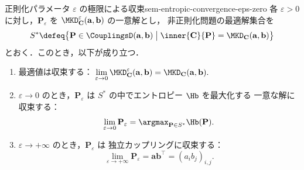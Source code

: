 \begin{theorem}{正則化パラメータ $\varepsilon$ の極限による収束}{sem-entropic-convergence-eps-zero}
  各 $\varepsilon > 0$ に対し，$\mathbf{P}_\varepsilon$ を
  $\MKD_{\mathbf{C}}^\varepsilon(\mathbf{a}, \mathbf{b})$ の一意解とし，
  非正則化問題の最適解集合を
  \[
    S^* \defeq \bigl\{ \mathbf{P} \in \CouplingsD(\mathbf{a},\mathbf{b}) \bigm|
      \inner{\mathbf{C}}{\mathbf{P}} = \MKD_{\mathbf{C}}(\mathbf{a},\mathbf{b}) \bigr\}
  \]
  とおく．このとき，以下が成り立つ．

  \begin{enumerate}
    \item[(i)]
      最適値は収束する：
      $\displaystyle
        \lim_{\varepsilon \to 0}
        \MKD_{\mathbf{C}}^\varepsilon(\mathbf{a},\mathbf{b})
        =
        \MKD_{\mathbf{C}}(\mathbf{a},\mathbf{b}).
      $
    \item[(ii)]
      $\varepsilon \to 0$ のとき，$\mathbf{P}_\varepsilon$ は
      $S^*$ の中でエントロピー $\Hb$ を最大化する
      一意な解に収束する：
      \[
        \lim_{\varepsilon \to 0} \mathbf{P}_\varepsilon
        =
        \argmax_{\mathbf{P} \in S^*} \Hb(\mathbf{P}).
      \]
    \item[(iii)]
      $\varepsilon \to +\infty$ のとき，$\mathbf{P}_\varepsilon$ は
      独立カップリングに収束する：
      \[
        \lim_{\varepsilon \to +\infty} \mathbf{P}_\varepsilon
        =
        \mathbf{a}\mathbf{b}^\top = (a_i b_j)_{i,j}.
      \]
  \end{enumerate}
\end{theorem}

